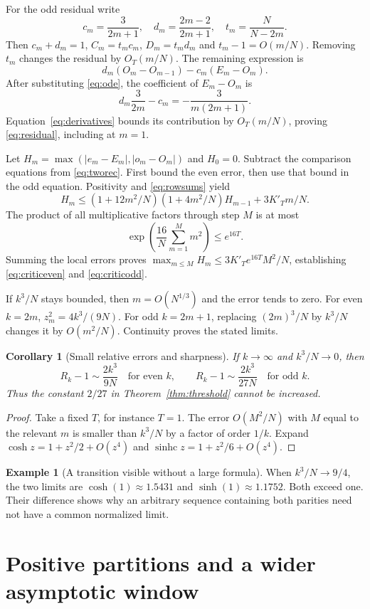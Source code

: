 \documentclass[11pt]{article}
\newtheorem{corollary}[theorem]{Corollary}
\theoremstyle{definition}
\newtheorem{example}[theorem]{Example}
\theoremstyle{remark}
\newcommand{\1}{\mathbf 1}
\newcommand{\shc}{\operatorname{sinhc}}
\begin{document}
For the odd residual write
\[
c_m=\frac3{2m+1},\quad d_m=\frac{2m-2}{2m+1},\quad t_m=\frac N{N-2m}.
\]
Then $c_m+d_m=1$, $C_m=t_mc_m$, $D_m=t_md_m$ and $t_m-1=O(m/N)$. Removing $t_m$ changes the residual by $O_T(m/N)$. The remaining expression is
\[
d_m(O_m-O_{m-1})-c_m(E_m-O_m).
\]
After substituting \eqref{eq:ode}, the coefficient of $E_m-O_m$ is
\[
d_m\frac3{2m}-c_m=-\frac3{m(2m+1)}.
\]
Equation~\eqref{eq:derivatives} bounds its contribution by $O_T(m/N)$, proving \eqref{eq:residual}, including at $m=1$.

Let $H_m=\max(|e_m-E_m|,|o_m-O_m|)$ and $H_0=0$. Subtract the comparison equations from \eqref{eq:tworec}. First bound the even error, then use that bound in the odd equation. Positivity and \eqref{eq:rowsums} yield
\[
H_m\le(1+12m^2/N)(1+4m^2/N)H_{m-1}+3K'_Tm/N.
\]
The product of all multiplicative factors through step $M$ is at most
\[
\exp\left(\frac{16}N\sum_{m=1}^M m^2\right)\le e^{16T}.
\]
Summing the local errors proves $\max_{m\le M}H_m\le3K'_Te^{16T}M^2/N$, establishing \eqref{eq:criticeven} and \eqref{eq:criticodd}.

If $k^3/N$ stays bounded, then $m=O(N^{1/3})$ and the error tends to zero. For even $k=2m$, $z_m^2=4k^3/(9N)$. For odd $k=2m+1$, replacing $(2m)^3/N$ by $k^3/N$ changes it by $O(m^2/N)$. Continuity proves the stated limits.

\begin{corollary}[Small relative errors and sharpness]\label{cor:small}
If $k\to\infty$ and $k^3/N\to0$, then
\[
R_k-1\sim\frac{2k^3}{9N}\quad\text{for even }k,
\qquad
R_k-1\sim\frac{2k^3}{27N}\quad\text{for odd }k.
\]
Thus the constant $2/27$ in Theorem~\ref{thm:threshold} cannot be increased.
\end{corollary}
\begin{proof}
Take a fixed $T$, for instance $T=1$. The error $O(M^2/N)$ with $M$ equal to the relevant $m$ is smaller than $k^3/N$ by a factor of order $1/k$. Expand $\cosh z=1+z^2/2+O(z^4)$ and $\shc z=1+z^2/6+O(z^4)$.
\end{proof}

\begin{example}[A transition visible without a large formula]
When $k^3/N\to9/4$, the two limits are $\cosh(1)\approx1.5431$ and $\sinh(1)\approx1.1752$. Both exceed one. Their difference shows why an arbitrary sequence containing both parities need not have a common normalized limit.
\end{example}


\clearpage
\section{Positive partitions and a wider asymptotic window}\label{sec:extension}
\end{document}
